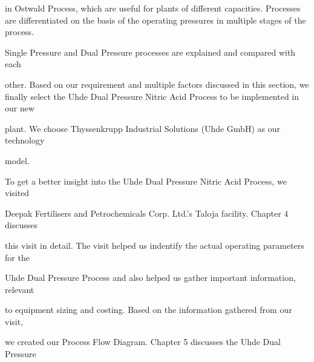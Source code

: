 \documentclass[a4paper,portrait,12pt]{article}
\begin{document}
\begin{flushleft}
in Ostwald Process, which are useful for plants of different capacities. Processes are differentiated on the basis of the operating pressures in multiple stages of the process.
\end{flushleft}


\begin{flushleft}
Single Pressure and Dual Pressure processes are explained and compared with each
\end{flushleft}


\begin{flushleft}
other. Based on our requirement and multiple factors discussed in this section, we finally select the Uhde Dual Pressure Nitric Acid Process to be implemented in our new
\end{flushleft}


\begin{flushleft}
plant. We choose Thyssenkrupp Industrial Solutions (Uhde GmbH) as our technology
\end{flushleft}


\begin{flushleft}
model.
\end{flushleft}





\begin{flushleft}
To get a better insight into the Uhde Dual Pressure Nitric Acid Process, we visited
\end{flushleft}


\begin{flushleft}
Deepak Fertilisers and Petrochemicals Corp. Ltd.'s Taloja facility. Chapter 4 discusses
\end{flushleft}


\begin{flushleft}
this visit in detail. The visit helped us indentify the actual operating parameters for the
\end{flushleft}


\begin{flushleft}
Uhde Dual Pressure Process and also helped us gather important information, relevant
\end{flushleft}


\begin{flushleft}
to equipment sizing and costing. Based on the information gathered from our visit,
\end{flushleft}


\begin{flushleft}
we created our Process Flow Diagram. Chapter 5 discusses the Uhde Dual Pressure
\end{flushleft}
\end{document}
